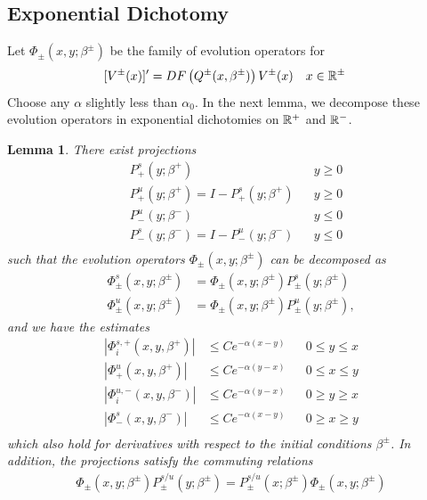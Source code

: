 \documentclass[10pt,reqno]{amsart}
\theoremstyle{plain}
\newtheorem{lemma}[theorem]{Lemma}
\theoremstyle{definition}
\theoremstyle{remark}
\numberwithin{theorem}{section}
\numberwithin{equation}{section}
\begin{document}
\subsection{Exponential Dichotomy}\label{sec:existdichot}

Let $\Phi_\pm(x, y; \beta^\pm)$ be the family of evolution operators for
\begin{align}\label{qpmODEs}
[V^\pm(x)]' &= D F\left(Q^\pm(x, \beta^\pm)\right) V^\pm(x) && x \in \mathbb{R}^\pm
\end{align}
Choose any $\alpha$ slightly less than $\alpha_0$. In the next lemma, we decompose these evolution operators in exponential dichotomies on $\mathbb{R}^+$ and $\mathbb{R}^-$. 

\begin{lemma}\label{dichotomy1}
There exist projections
\begin{align*}
&P_+^s(y; \beta^+) && y \geq 0 \\
&P_+^u(y; \beta^+) = I - P_+^s(y; \beta^+) && y \geq 0 \\
&P_-^u(y; \beta^-) && y \leq 0 \\
&P_-^s(y; \beta^-) = I - P_-^u(y; \beta^-) && y \leq 0 \\
\end{align*}
such that the evolution operators $\Phi_\pm(x, y; \beta^\pm)$ can be decomposed as
\begin{align*}
\Phi^s_\pm(x, y; \beta^\pm) &= \Phi_\pm(x, y; \beta^\pm) P^s_\pm(y; \beta^\pm) \\
\Phi^u_\pm(x, y; \beta^\pm) &= \Phi_\pm(x, y; \beta^\pm) P^u_\pm(y; \beta^\pm),
\end{align*}
and we have the estimates
\begin{align*}
|\Phi_i^{s,+}(x, y, \beta^+)| &\leq C e^{-\alpha(x - y)} && 0 \leq y \leq x \\
|\Phi^u_+(x, y, \beta^+)| &\leq C e^{-\alpha(y - x)} && 0 \leq x \leq y \\
|\Phi_i^{u,-}(x, y, \beta^-)| &\leq C e^{-\alpha(y - x)} && 0 \geq y \geq x \\
|\Phi^s_-(x, y, \beta^-)| &\leq C e^{-\alpha(x - y)} && 0 \geq x \geq y \\
\end{align*}
which also hold for derivatives with respect to the initial conditions $\beta^\pm$. In addition, the projections satisfy the commuting relations
\begin{align*}
\Phi_\pm(x, y; \beta^\pm) P^{s/u}_\pm(y; \beta^\pm) 
= P^{s/u}_\pm(x; \beta^\pm) \Phi_\pm(x, y; \beta^\pm)

\end{align*}
\end{lemma}
\end{document}
